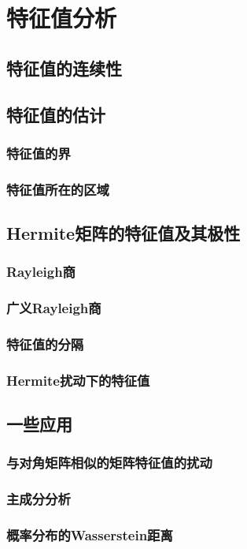 \chapter{特征值分析}
\label{cha:特征值分析}

\section{特征值的连续性}
\label{sec:特征值的连续性}

\section{特征值的估计}
\label{sec:特征值的估计}

\subsection{特征值的界}
\label{sub:特征值的界}

\subsection{特征值所在的区域}
\label{sub:特征值所在的区域}

\section{Hermite矩阵的特征值及其极性}
\label{sec:Hermite矩阵的特征值及其极性}

\subsection{Rayleigh商}
\label{sub:Rayleigh商}

\subsection{广义Rayleigh商}
\label{sub:广义Rayleigh商}

\subsection{特征值的分隔}
\label{sub:特征值的分隔}

\subsection{Hermite扰动下的特征值}
\label{sub:Hermite扰动下的特征值}

\section{一些应用}
\label{sec:一些应用}

\subsection{与对角矩阵相似的矩阵特征值的扰动}
\label{sub:与对角矩阵相似的矩阵特征值的扰动}

\subsection{主成分分析}
\label{sub:主成分分析}

\subsection{概率分布的Wasserstein距离}
\label{sub:概率分布的Wasserstein距离}


